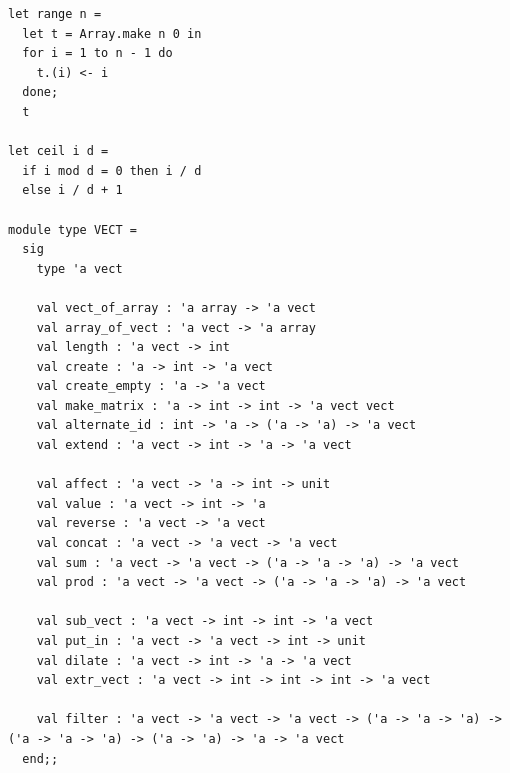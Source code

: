 \documentclass[a4paper,10pt]{report}
\theoremstyle{break}
\begin{document}
    \begin{lstlisting}
let range n =
  let t = Array.make n 0 in
  for i = 1 to n - 1 do
    t.(i) <- i
  done;
  t

let ceil i d =
  if i mod d = 0 then i / d
  else i / d + 1

module type VECT =
  sig
    type 'a vect

    val vect_of_array : 'a array -> 'a vect
    val array_of_vect : 'a vect -> 'a array
    val length : 'a vect -> int
    val create : 'a -> int -> 'a vect
    val create_empty : 'a -> 'a vect
    val make_matrix : 'a -> int -> int -> 'a vect vect
    val alternate_id : int -> 'a -> ('a -> 'a) -> 'a vect
    val extend : 'a vect -> int -> 'a -> 'a vect

    val affect : 'a vect -> 'a -> int -> unit
    val value : 'a vect -> int -> 'a
    val reverse : 'a vect -> 'a vect
    val concat : 'a vect -> 'a vect -> 'a vect
    val sum : 'a vect -> 'a vect -> ('a -> 'a -> 'a) -> 'a vect
    val prod : 'a vect -> 'a vect -> ('a -> 'a -> 'a) -> 'a vect

    val sub_vect : 'a vect -> int -> int -> 'a vect
    val put_in : 'a vect -> 'a vect -> int -> unit
    val dilate : 'a vect -> int -> 'a -> 'a vect
    val extr_vect : 'a vect -> int -> int -> int -> 'a vect

    val filter : 'a vect -> 'a vect -> 'a vect -> ('a -> 'a -> 'a) -> ('a -> 'a -> 'a) -> ('a -> 'a) -> 'a -> 'a vect
  end;;
	
    \end{lstlisting}
\newpage
\end{document}
